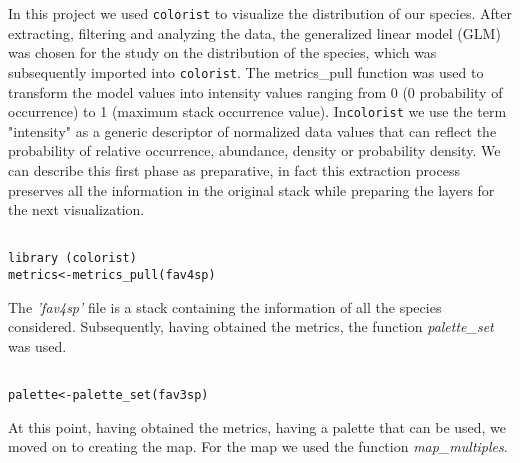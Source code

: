 \documentclass[12pt,a4paper]{article}
\begin{document}
In this project we used \texttt{colorist} to visualize the distribution of our species.
After extracting, filtering and analyzing the data, the generalized linear model (GLM) was chosen for the study on the distribution of the species, which was subsequently imported into \texttt{colorist}.
The metrics\_pull function was used to transform the model values into intensity values ranging from 0 (0 probability of occurrence) to 1 (maximum stack occurrence value).
  In\texttt{colorist} we use the term "intensity" as a generic descriptor of normalized data values that can reflect the probability of relative occurrence, abundance, density or probability density.\citep{colo}
We can describe this first phase as preparative, in fact this extraction process preserves all the information in the original stack while preparing the layers for the next visualization.

\begin{lstlisting}

library (colorist)
metrics<-metrics_pull(fav4sp) 

\end{lstlisting}

\bigskip
The \textit{'fav4sp'} file is a stack containing the information of all the species considered.
Subsequently, having obtained the metrics, the function \textit{palette\_set} was used.

\begin{lstlisting}

palette<-palette_set(fav3sp)
\end{lstlisting}

\bigskip
At this point, having obtained the metrics, having a palette that can be used, we moved on to creating the map.
For the map we used the function \textit{map\_multiples}. 
\end{document}
